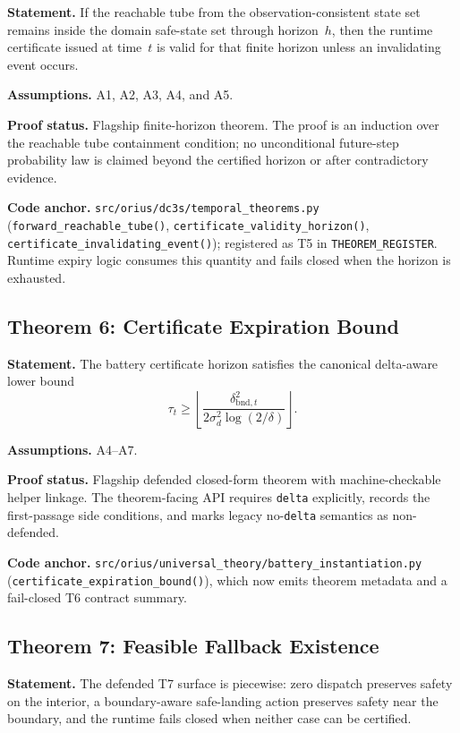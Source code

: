 \textbf{Statement.} If the reachable tube from the observation-consistent
state set remains inside the domain safe-state set through horizon~$h$, then
the runtime certificate issued at time~$t$ is valid for that finite horizon
unless an invalidating event occurs.

\textbf{Assumptions.} A1, A2, A3, A4, and A5.

\textbf{Proof status.} Flagship finite-horizon theorem.  The proof is an
induction over the reachable tube containment condition; no unconditional
future-step probability law is claimed beyond the certified horizon or after
contradictory evidence.

\textbf{Code anchor.} \texttt{src/orius/dc3s/temporal\_theorems.py}
(\texttt{forward\_reachable\_tube()},
\texttt{certificate\_validity\_horizon()},
\texttt{certificate\_invalidating\_event()}); registered as T5 in
\texttt{THEOREM\_REGISTER}.  Runtime expiry logic consumes this quantity and
fails closed when the horizon is exhausted.

\subsection{Theorem 6: Certificate Expiration Bound}
\label{sec:thm-cert-expiration}

\textbf{Statement.} The battery certificate horizon satisfies the canonical
delta-aware lower bound
\[
  \tau_t \ge
  \left\lfloor
    \frac{\delta_{\mathrm{bnd},t}^2}
    {2\sigma_d^2\log(2/\delta)}
  \right\rfloor.
\]

\textbf{Assumptions.} A4--A7.

\textbf{Proof status.} Flagship defended closed-form theorem with
machine-checkable helper linkage.  The theorem-facing API requires
\texttt{delta} explicitly, records the first-passage side conditions, and
marks legacy no-\texttt{delta} semantics as non-defended.

\textbf{Code anchor.} \texttt{src/orius/universal\_theory/battery\_instantiation.py}
(\texttt{certificate\_expiration\_bound()}), which now emits theorem metadata
and a fail-closed T6 contract summary.

\subsection{Theorem 7: Feasible Fallback Existence}
\label{sec:thm-fallback}

\textbf{Statement.} The defended T7 surface is piecewise: zero dispatch
preserves safety on the interior, a boundary-aware safe-landing action
preserves safety near the boundary, and the runtime fails closed when neither
case can be certified.

